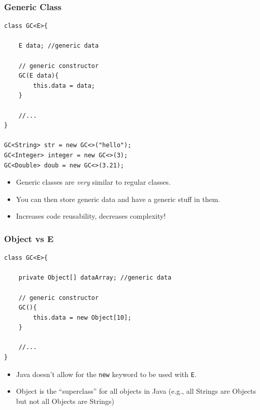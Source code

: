 \documentclass{beamer}
\begin{document}
\begin{frame}[fragile]
    \frametitle{Generic Class}
    \begin{minipage}{0.54\textwidth}
        \begin{lstlisting}[basicstyle=\scriptsize]
class GC<E>{

    E data; //generic data
    
    // generic constructor
    GC(E data){
        this.data = data;
    }

    //...
}

GC<String> str = new GC<>("hello");
GC<Integer> integer = new GC<>(3);
GC<Double> doub = new GC<>(3.21);
        \end{lstlisting}
    \end{minipage}
    \begin{minipage}{0.44\textwidth}
        \begin{itemize}
            \item Generic classes are \textit{very} similar to regular classes.
            \item You can then store generic data and have a generic stuff in them.
            \item Increases code reusability, decreases complexity!
        \end{itemize}
    \end{minipage}
\end{frame}

\begin{frame}[fragile]
    \frametitle{Object vs E}
    \begin{minipage}{0.54\textwidth}
        \begin{lstlisting}[basicstyle=\scriptsize]
class GC<E>{

    private Object[] dataArray; //generic data
    
    // generic constructor
    GC(){
        this.data = new Object[10];
    }

    //...
}
        \end{lstlisting}
    \end{minipage}
    \begin{minipage}{0.44\textwidth}
        \begin{itemize}
            \item Java doesn't allow for the \lstinline|new| keyword to be used with \lstinline|E|.
            \item Object is the ``superclass'' for all objects in Java (e.g., all Strings are Objects but not all Objects are Strings)
        \end{itemize}
    \end{minipage}
\end{frame}
\end{document}
